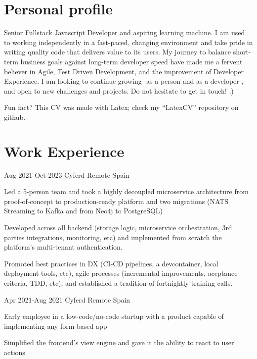 \documentclass[10pt]{CurriculumVitae}
\begin{document}
  \makeheading

  \section{Personal profile}
    {
      Senior Fullstack Javascript Developer and aspiring learning machine.
      I am used to working independently in a fast-paced, changing environment and take pride in writing quality code that delivers value to its users.
      My journey to balance short-term business goals against long-term developer speed have made me a fervent believer in Agile, Test Driven Development, and the improvement of Developer Experience.
      I am looking to continue growing -as a person and as a developer-, and open to new challenges and projects.
      Do not hesitate to get in touch! ;) 
      
      \null\hfill {\scriptsize Fun fact? This CV was made with Latex; check my ``LatexCV'' repository on github.}
    }


  \section{Work Experience}

      {Aug 2021-Oct 2023}
      {Cyferd}
      {Remote}
      {Spain}
      {
        \item Led a 5-person team and took a highly decoupled microservice architecture from proof-of-concept to production-ready platform and two migrations (NATS Streaming to Kafka and from Neo4j to PostgreSQL)
        \item Developed across all backend (storage logic, microservice orchestration, 3rd parties integrations, monitoring, etc) and implemented from scratch the platform's multi-tenant authentication.
        \item Promoted best practices in DX (CI-CD pipelines, a devcontainer, local deployment tools, etc), agile processes (incremental improvements, aceptance criteria, TDD, etc), and established a tradition of fortnightly training calls.
      }

      {Apr 2021-Aug 2021}
      {Cyferd}
      {Remote}
      {Spain}
      {
        \item Early employee in a low-code/no-code startup with a product capable of implementing any form-based app
        \item Simplified the frontend's view engine and gave it the ability to react to user actions
      }
\end{document}
